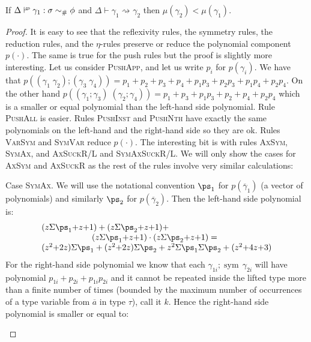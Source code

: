 \documentclass[a4paper,UKenglish]{lipics}
\def\fiddle#1{\hspace*{-0.8ex}\raisebox{0.1ex}{$\scriptscriptstyle#1$}}
\def\rulename#1{\textsc{#1}}
\newcommand{\wfco}{\vdash^{\fiddle{\sf{co}}}}
\newcommand{\psim}{\mathrel{\sim_{\tiny \#}}}
\def\rulename#1{\textsc{#1}}
\newcommand{\ol}[1]{\overline{#1}}
\newcommand{\sym}[1]{\mathop{sym}\, #1}
\newcommand{\rsa}[1]{\rightsquigarrow_{#1}}
\newcommand{\as}{\ol{a}}
\newcommand{\gammas}{\ol{\gamma}}
\begin{document}
\begin{theorem}[Termination]
If $\Delta \wfco \gamma_1 : \sigma \psim \phi$ and $\Delta \vdash \gamma_1 \rsa{} \gamma_2$ then $\mu(\gamma_2) < \mu(\gamma_1)$. 
\end{theorem}
\vspace{-10pt}\begin{proof}
It is easy to see that the reflexivity rules, the symmetry rules, the reduction rules, and the 
$\eta$-rules preserve or reduce the polynomial component $p(\cdot)$. The same is true for the push rules 
but the proof is slightly more interesting. Let us consider \rulename{PushApp}, and let us write
$p_i$ for $p(\gamma_i)$. We have that 
$p((\gamma_1\;\gamma_2);(\gamma_3\;\gamma_4)) = p_1 + p_2 + p_3 + p_4 + p_1p_3 + p_2p_3 + p_1p_4 + p_2p_4$. On 
the other hand $p((\gamma_1;\gamma_3)\;(\gamma_2;\gamma_4)) = p_1 + p_3 + p_1p_3 + p_2 + p_4 + p_2p_4$ which is a smaller
or equal polynomial than the left-hand side polynomial.
Rule \rulename{PushAll} is easier. Rules \rulename{PushInst} and \rulename{PushNth} have exactly the same polynomials on the left-hand and 
the right-hand side so they are ok. Rules \rulename{VarSym} and \rulename{SymVar} reduce $p(\cdot)$. 
The interesting bit is with rules \rulename{AxSym}, \rulename{SymAx}, and \rulename{AxSuckR/L} 
and \rulename{SymAxSuckR/L}. We will only show the cases for \rulename{AxSym} and \rulename{AxSuckR} 
as the rest of the rules involve very similar calculations: 
\begin{itemize*}
  \item Case \rulename{SymAx}. We will use the notational convention $\ps_1$ for $p(\gammas_1)$ (a vector of polynomials)
   and similarly $\ps_2$ for $p(\gammas_2)$. Then the left-hand side polynomial is:
   \[\begin{array}{l} 
      (z\Sigma\ps_1{+}z{+}1) + (z\Sigma\ps_2{+}z{+}1) + \\ 
      \quad\quad\quad\quad\quad\quad (z\Sigma\ps_1{+}z{+}1)\cdot(z\Sigma\ps_2{+}z{+}1) = \\
      (z^2{+}2z)\Sigma\ps_1 + (z^2{+}2z)\Sigma\ps_2 + z^2\Sigma\ps_1\Sigma\ps_2 + (z^2{+}4z{+}3)
   \end{array}\] 
  For the right-hand side polynomial we know that each $\gamma_{1i};\sym{\gamma_{2i}}$ will have polynomial
  $p_{1i}+p_{2i}+p_{1i} p_{2i}$ and it cannot be repeated inside the lifted type more than a finite
  number of times (bounded by the maximum number of occurrences of a type variable from $\as$ in
  type $\tau$), call it $k$. Hence the right-hand side polynomial is smaller or equal to: 

\end{itemize*}
\end{proof}
\end{document}
